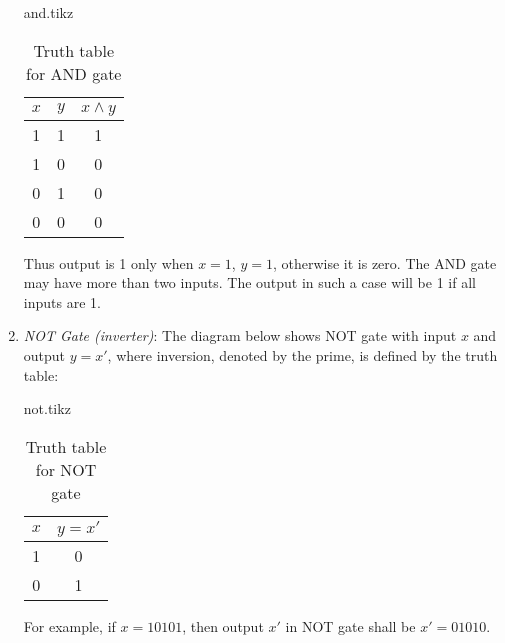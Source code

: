 \documentclass[../main-sheet.tex]{subfiles}
\begin{document}
\begin{enumerate}
        \begin{table}[H]
            \begin{minipage}[c]{0.5\textwidth}
                \centering
                {and.tikz}
            \end{minipage}\hfill
            \begin{minipage}[c]{0.5\textwidth}
                \centering
                \begin{tabular}{ccc}
                    \toprule
                    $ x $ &$ y $& $ x\land y $\\
                    \midrule
                    1 & 1 & 1\\
                    1&0&0\\
                    0&1&0\\
                    0&0&0\\
                    \bottomrule
                \end{tabular}
                \caption{Truth table for AND gate}
            \end{minipage}
        \end{table}
        Thus output is 1 only when $ x=1 $, $ y=1 $, otherwise it is zero.
        The AND gate may have more than two inputs. The output in such a case will be 1 if all inputs are 1.
        \item \emph{NOT Gate (inverter)}: The diagram below shows NOT gate with input $ x $ and output $ y=x' $, where inversion, denoted by the prime, is defined by the truth table:
        \begin{table}[H]
            \begin{minipage}[c]{0.5\textwidth}
                \centering
                {not.tikz}
            \end{minipage}\hfill
            \begin{minipage}[c]{0.5\textwidth}
                \centering
                \begin{tabular}{cc}
                    \toprule
                    $ x $ &$ y = x'$\\
                    \midrule
                    1 & 0\\
                    0&1\\
                    \bottomrule
                \end{tabular}
                \caption{Truth table for NOT gate}
            \end{minipage}
        \end{table}
        For example, if $ x=10101 $, then output $ x' $ in NOT gate shall be $ x'=01010 $.
    \end{enumerate}
\end{document}
